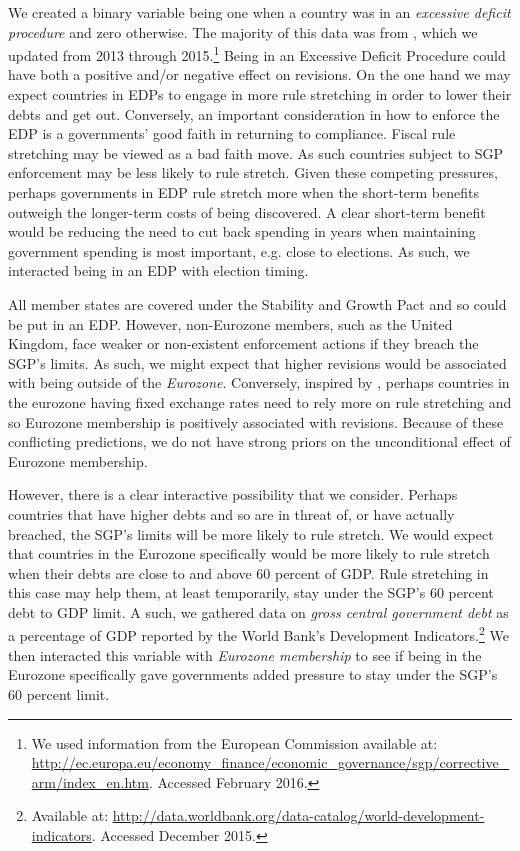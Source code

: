 \documentclass[]{article}
\begin{document}
We created a binary variable being one when a country was in an \emph{excessive deficit procedure} and zero otherwise. The majority of this data was from \cite{baergHallerberg2016}, which we updated from 2013 through 2015.\footnote{We used information from the European Commission available at: \url{http://ec.europa.eu/economy_finance/economic_governance/sgp/corrective_arm/index_en.htm}. Accessed February 2016.}  Being in an Excessive Deficit Procedure could have both a positive and/or negative effect on revisions. On the one hand we may expect countries in EDPs to engage in more rule stretching in order to lower their debts and get out. Conversely, an important consideration in how to enforce the EDP is a governments' good faith in returning to compliance. Fiscal rule stretching may be viewed as a bad faith move. As such countries subject to SGP enforcement may be less likely to rule stretch. Given these competing pressures, perhaps governments in EDP rule stretch more when the short-term benefits outweigh the longer-term costs of being discovered. A clear short-term benefit would be reducing the need to cut back spending in years when maintaining government spending is most important, e.g. close to elections. As such, we interacted being in an EDP with election timing.

All member states are covered under the Stability and Growth Pact and so could be put in an EDP. However, non-Eurozone members, such as the United Kingdom, face weaker or non-existent enforcement actions if they breach the SGP's limits. As such, we might expect that higher revisions would be associated with being outside of the \emph{Eurozone}. Conversely, inspired by \cite{clark2003}, perhaps countries in the eurozone having fixed exchange rates need to rely more on rule stretching and so Eurozone membership is positively associated with revisions. Because of these conflicting predictions, we do not have strong priors on the unconditional effect of Eurozone membership.

However, there is a clear interactive possibility that we consider. Perhaps countries that have higher debts and so are in threat of, or have actually breached, the SGP's limits will be more likely to rule stretch. We would expect that countries in the Eurozone specifically would be more likely to rule stretch when their debts are close to and above 60 percent of GDP. Rule stretching in this case may help them, at least temporarily, stay under the SGP's 60 percent debt to GDP limit. A such, we gathered data on \emph{gross central government debt} as a percentage of GDP reported by the World Bank's Development Indicators.\footnote{Available at: \url{http://data.worldbank.org/data-catalog/world-development-indicators}. Accessed December 2015.} We then interacted this variable with \emph{Eurozone membership} to see if being in the Eurozone specifically gave governments added pressure to stay under the SGP's 60 percent limit.
\end{document}
